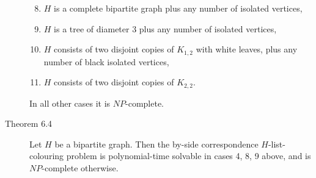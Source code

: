\documentclass{fit-teorsem}
\begin{document}
\begin{description}
		\begin{enumerate}
			\setcounter{enumi}{7}
			\item $H$ is a complete bipartite graph plus any number of isolated vertices,
			\item $H$ is a tree of diameter 3 plus any number of isolated vertices,
			\item $H$ consists of two disjoint copies of $K_{1, 2}$ with white leaves,
				plus any number of black isolated vertices,
			\item $H$ consists of two disjoint copies of $K_{2, 2}$.
		\end{enumerate}

		In all other cases it is $NP$-complete.

	\item[Theorem 6.4] Let $H$ be a bipartite graph. Then the by-side correspondence $H$-list-colouring problem is polynomial-time solvable in cases 4, 8, 9 above, and is $NP$-complete otherwise.
\end{description}
\end{document}
